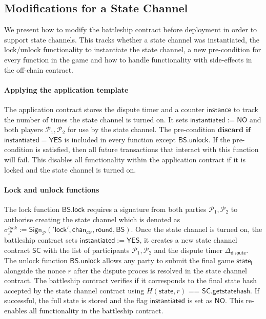 \documentclass{llncs}
\newcommand{\instantiated}{\mathsf{instantiated}}
\newcommand{\instantiatedno}{\mathsf{NO}}
\newcommand{\instantiatedyes}{\mathsf{YES}}
\newcommand{\stateinfo}{\mathsf{state}}
\newcommand{\stateinfoi}{\mathsf{state}_{\mathsf{i}}}
\newcommand{\participant}{\mathcal{P}}
\newcommand{\statechannel}{\mathsf{SC}}
\newcommand{\statechannelgetcommitment}{\mathsf{SC}.\mathsf{getstatehash}}
\newcommand{\sign}{\mathsf{Sign}}
\newcommand{\battleship}{\mathsf{BS}}
\newcommand{\battleshiplock}{\mathsf{BS.lock}}
\newcommand{\battleshipunlock}{\mathsf{BS.unlock}}
\newcommand{\timerdispute}{\mathsf{\Delta}_{\mathsf{dispute}}}
\begin{document}
	\subsection{Modifications for a State Channel}
	
	We present how to modify the battleship contract before deployment in order to support state channels.
	This tracks whether a state channel was instantiated,  the lock/unlock functionality to instantiate the state channel, a new pre-condition for every function in the game and how to handle functionality with side-effects in the off-chain contract. 
	
	\paragraph{Applying the application template}
	The application contract stores the dispute timer and a counter $\mathsf{instance}$ to track the number of times the state channel is turned on. 
	It sets $\instantiated := \instantiatedno$ and both players $\participant_{1},\participant_{2}$ for use by the state channel.
	The pre-condition $\textbf{discard if}$ $ \instantiated  = \instantiatedyes$ is included in every function except $\battleshipunlock$. 
	If the pre-condition is satisfied, then all future transactions that interact with this function will fail.
	This disables all functionality within the application contract if it is locked and the state channel is turned on. 
	
	\paragraph{Lock and unlock functions} 
	The lock function $\battleshiplock$ requires a signature from both parties $\participant_{1},\participant_{2}$ to authorise creating the state channel which is denoted as $\sigma^{lock}_{\participant} := \sign_{\participant}('\mathsf{lock}', \mathsf{chan}_{\mathsf{ctr}}, \mathsf{round}, \battleship)$.
	Once the state channel is turned on, the battleship contract sets $\instantiated := \instantiatedyes$, it creates a new state channel contract $\statechannel$ with the list of participants $\participant_{1},\participant_{2}$ and the dispute timer $\timerdispute$. 
	The unlock function $\battleshipunlock$ allows any party to submit the final game $\stateinfoi$ alongside the nonce $r$ after the dispute proces is resolved in the state channel contract. 
	The battleship contract verifies if it corresponds to the final state hash accepted by the state channel contract using $H(\stateinfo,r)$ == $\statechannelgetcommitment$.
	If successful, the full state is stored and the flag $\instantiated$ is set as $\instantiatedno$.
	This re-enables all functionality in the battleship contract. 
	
\end{document}
